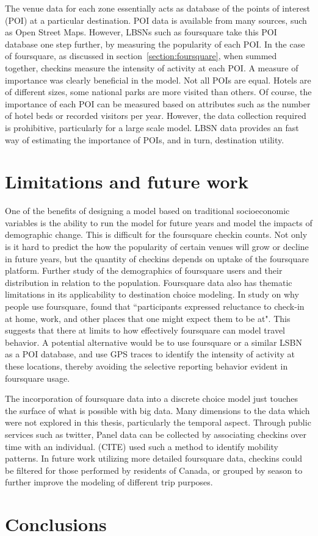The venue data for each zone essentially acts as database of the points of interest (POI) at a particular destination. POI data is available from many sources, such as Open Street Maps. However, LBSNs such as foursquare take this POI database one step further, by measuring the popularity of each POI. In the case of foursquare, as discussed in section~\ref{section:foursquare}, when summed together, checkins measure the intensity of activity at each POI. A measure of importance was clearly beneficial in the model. Not all POIs are equal. Hotels are of different sizes, some national parks are more visited than others. Of course, the importance of each POI can be measured based on attributes such as the number of hotel beds or recorded visitors per year. However, the data collection required is prohibitive, particularly for a large scale model. LBSN data provides an fast way of estimating the importance of POIs, and in turn, destination utility. 

\section{Limitations and future work}
One of the benefits of designing a model based on traditional socioeconomic variables is the ability to run the model for future years and model the impacts of demographic change. This is difficult for the foursquare checkin counts. Not only is it hard to predict the how the popularity of certain venues will grow or decline in future years, but the quantity of checkins depends on uptake of the foursquare platform. Further study of the demographics of foursquare users and their distribution in relation to the population. Foursquare data also has thematic limitations in its applicability to destination choice modeling. 
In study on why people use foursquare, \textcite{lindqvist2011m} found that ``participants expressed reluctance to check-in at home, work, and other places that one might expect them to be at". This suggests that there at limits to how effectively foursquare can model travel behavior. A potential alternative would be to use foursquare or a similar LSBN as a POI database, and use GPS traces to identify the intensity of activity at these locations, thereby avoiding the selective reporting behavior evident in foursquare usage.

The incorporation of foursquare data into a discrete choice model just touches the surface of what is possible with big data. 
Many dimensions to the data which were not explored in this thesis,  particularly the temporal aspect. Through public services such as twitter, Panel data can be collected by associating checkins over time with an individual. (CITE) used such a method to identify mobility patterns. In future work utilizing more detailed foursquare data, checkins could be filtered for those performed by residents of Canada, or grouped by season to further improve the modeling of different trip purposes.

\section{Conclusions}
